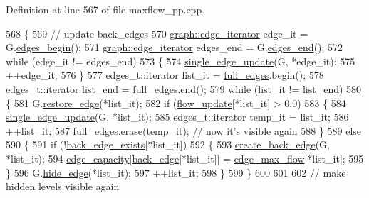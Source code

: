 Definition at line 567 of file maxflow\+\_\+pp.\+cpp.


\begin{DoxyCode}
568 \{
569     \textcolor{comment}{// update back\_edges}
570     \mbox{\hyperlink{classgraph_a818d3766018eb0af91d520ce2150203c}{graph::edge\_iterator}} edge\_it = G.\mbox{\hyperlink{classgraph_a7ba35a4c4e8343ffb27ed6d9703c6f18}{edges\_begin}}();
571     \mbox{\hyperlink{classgraph_a818d3766018eb0af91d520ce2150203c}{graph::edge\_iterator}} edges\_end = G.\mbox{\hyperlink{classgraph_aea8d7f976b85b6137f52d915e26639f6}{edges\_end}}();
572     \textcolor{keywordflow}{while} (edge\_it != edges\_end)
573     \{
574     \mbox{\hyperlink{classmaxflow__pp_a3e59652a416d1553f8a1d1229dd2cd38}{single\_edge\_update}}(G, *edge\_it);
575     ++edge\_it;
576     \}
577     edges\_t::iterator list\_it = \mbox{\hyperlink{classmaxflow__pp_a504adabbe1e7b11a910d6c43a6b71a75}{full\_edges}}.begin();
578     edges\_t::iterator list\_end = \mbox{\hyperlink{classmaxflow__pp_a504adabbe1e7b11a910d6c43a6b71a75}{full\_edges}}.end();
579     \textcolor{keywordflow}{while} (list\_it != list\_end)
580     \{
581     G.\mbox{\hyperlink{classgraph_a2e5426682a0897b9f9104b019970bedc}{restore\_edge}}(*list\_it);
582     \textcolor{keywordflow}{if} (\mbox{\hyperlink{classmaxflow__pp_ad37aff831935b2cfd4b03bc4a6da06ce}{flow\_update}}[*list\_it] > 0.0)
583     \{
584         \mbox{\hyperlink{classmaxflow__pp_a3e59652a416d1553f8a1d1229dd2cd38}{single\_edge\_update}}(G, *list\_it);
585         edges\_t::iterator temp\_it = list\_it;
586         ++list\_it;
587         \mbox{\hyperlink{classmaxflow__pp_a504adabbe1e7b11a910d6c43a6b71a75}{full\_edges}}.erase(temp\_it);    \textcolor{comment}{// now it's visible again}
588     \}
589     \textcolor{keywordflow}{else}
590     \{
591         \textcolor{keywordflow}{if} (!\mbox{\hyperlink{classmaxflow__pp_a50e9c82f1e720b8340ea4dc6d438f110}{back\_edge\_exists}}[*list\_it])
592         \{
593         \mbox{\hyperlink{classmaxflow__pp_a20abf72dadaac19acb027ff5fa62de2a}{create\_back\_edge}}(G, *list\_it);
594         \mbox{\hyperlink{classmaxflow__pp_af3cdc4999a86322271a80b1855d58629}{edge\_capacity}}[\mbox{\hyperlink{classmaxflow__pp_a9fdef5a86459eaf9634737094f3de250}{back\_edge}}[*list\_it]] = \mbox{\hyperlink{classmaxflow__pp_a25d5bb2ab6c775a634dacf408ff55a83}{edge\_max\_flow}}[*list\_it];
595         \}
596         G.\mbox{\hyperlink{classgraph_ab2f8520bcac080d73c55228fecc61825}{hide\_edge}}(*list\_it);
597         ++list\_it;
598     \}
599     \}
600 
601     
602     \textcolor{comment}{// make hidden levels visible again}

\end{DoxyCode}

